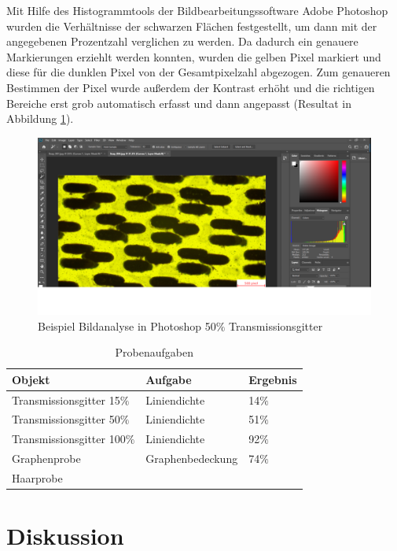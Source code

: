 \documentclass[12pt,a4paper,twoside]{article}
\begin{document}
\noindent
Mit Hilfe des Histogrammtools der Bildbearbeitungssoftware Adobe Photoshop wurden die Verhältnisse der schwarzen Flächen festgestellt, um dann mit der angegebenen Prozentzahl verglichen zu werden.
Da dadurch ein genauere Markierungen erziehlt werden konnten, wurden die gelben Pixel markiert und diese für die dunklen Pixel von der Gesamtpixelzahl abgezogen.
Zum genaueren Bestimmen der Pixel wurde außerdem der Kontrast erhöht und die richtigen Bereiche erst grob automatisch erfasst und dann angepasst (Resultat in Abbildung \ref{fig:Photoshop}).

\begin{figure}[H]
    \centering
    \includegraphics[width=0.6\linewidth, angle=0]{nudes/mikro/Photoshop.png}
    \caption{Beispiel Bildanalyse in Photoshop 50$\%$ Transmissionsgitter}
    \label{fig:Photoshop}
\end{figure}

\begin{table}[H]
    \centering
    \caption{Probenaufgaben}
    \label{tab:Probenaufgabe}
    \begin{tabular}{| l | l | l |}
        \hline
        Objekt & Aufgabe & Ergebnis \\
        \hline
        Transmissionsgitter 15$\%$ & Liniendichte & 14$\%$ \\
        Transmissionsgitter 50$\%$ & Liniendichte & 51$\%$ \\
        Transmissionsgitter 100$\%$ & Liniendichte & 92$\%$ \\
        Graphenprobe & Graphenbedeckung & 74$\%$ \\
        Haarprobe & & \\
        \hline
    \end{tabular}
\end{table}


\section{Diskussion} %
\end{document}
